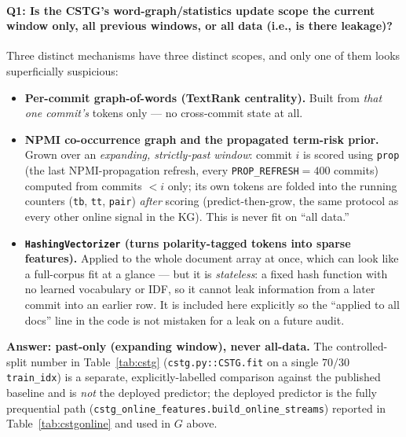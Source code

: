 \documentclass[11pt,a4paper]{article}
\newcommand{\code}[1]{\texttt{#1}}
\begin{document}
	\paragraph{Q1: Is the CSTG's word-graph/statistics update scope the current
	window only, all previous windows, or all data (i.e., is there leakage)?}
	Three distinct mechanisms have three distinct scopes, and only one of them
	looks superficially suspicious:
	\begin{itemize}[nosep,leftmargin=1.4em]
		\item \textbf{Per-commit graph-of-words (TextRank centrality).} Built from
		\emph{that one commit's} tokens only --- no cross-commit state at all.
		\item \textbf{NPMI co-occurrence graph and the propagated term-risk prior.}
		Grown over an \emph{expanding, strictly-past window}: commit $i$ is scored
		using \code{prop} (the last NPMI-propagation refresh, every
		\code{PROP\_REFRESH}$=400$ commits) computed from commits $<i$ only; its own
		tokens are folded into the running counters (\code{tb}, \code{tt}, \code{pair})
		\emph{after} scoring (predict-then-grow, the same protocol as every other
		online signal in the KG). This is never fit on ``all data.''
		\item \textbf{\code{HashingVectorizer} (turns polarity-tagged tokens into
		sparse features).} Applied to the whole document array at once, which can
		look like a full-corpus fit at a glance --- but it is \emph{stateless}: a
		fixed hash function with no learned vocabulary or IDF, so it cannot leak
		information from a later commit into an earlier row. It is included here
		explicitly so the ``applied to all docs'' line in the code is not mistaken
		for a leak on a future audit.
	\end{itemize}
	\textbf{Answer: past-only (expanding window), never all-data.} The controlled-split
	number in Table~\ref{tab:cstg} (\code{cstg.py::CSTG.fit} on a single $70/30$
	\code{train\_idx}) is a separate, explicitly-labelled comparison against the
	published baseline and is \emph{not} the deployed predictor; the deployed
	predictor is the fully prequential path
	(\code{cstg\_online\_features.build\_online\_streams}) reported in
	Table~\ref{tab:cstgonline} and used in $G$ above.
\end{document}
